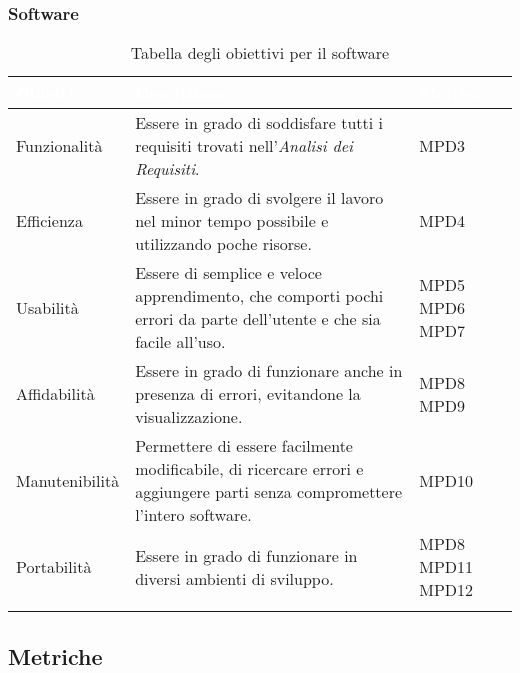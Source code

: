 \subsubsection{Software}
\begin{center}
  \renewcommand{\arraystretch}{1.25}
  \begin{longtable}{|p{3cm}|p{7.5cm}|p{2cm}|} \hline
    \rowcolor[HTML]{036400}
    \textcolor{white}{\textbf{Obiettivo}} & \textcolor{white}{\textbf{Descrizione}} & \textcolor{white}{\textbf{Metrica}}  \\ \hline
    \rowcolor[HTML]{EFEFEF}
    Funzionalità & Essere in grado di soddisfare tutti i requisiti trovati nell'\textit{Analisi dei Requisiti}.  & MPD3       \\ \hline
    \rowcolor[HTML]{C0C0C0}
    Efficienza & Essere in grado di svolgere il lavoro nel minor tempo possibile e utilizzando poche risorse.   & MPD4       \\ \hline
    \rowcolor[HTML]{EFEFEF}
    Usabilità & Essere di semplice e veloce apprendimento, che comporti pochi errori da parte dell'utente e che sia facile all'uso.  & MPD5 \newline MPD6 \newline MPD7    \\ \hline
    \rowcolor[HTML]{C0C0C0}
    Affidabilità & Essere in grado di funzionare anche in presenza di errori, evitandone la visualizzazione.  & MPD8 \newline MPD9       \\ \hline
    \rowcolor[HTML]{EFEFEF}
    Manutenibilità & Permettere di essere facilmente modificabile, di ricercare errori e aggiungere parti senza compromettere l'intero software.  & MPD10       \\ \hline
    \rowcolor[HTML]{C0C0C0}
    Portabilità & Essere in grado di funzionare in diversi ambienti di sviluppo. & MPD8 \newline MPD11 \newline MPD12       \\ \hline
    \caption{Tabella degli obiettivi per il software}
  \end{longtable}
\end{center}


\subsection{Metriche}
